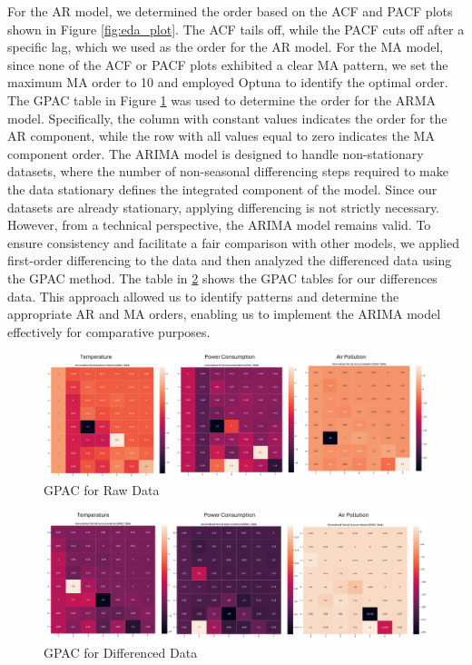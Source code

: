 \documentclass{scrartcl}
\begin{document}
For the AR model, we determined the order based on the ACF and PACF plots shown in Figure \ref{fig:eda_plot}. The ACF tails off, while the PACF cuts off after a specific lag, which we used as the order for the AR model. For the MA model, since none of the ACF or PACF plots exhibited a clear MA pattern, we set the maximum MA order to 10 and employed Optuna to identify the optimal order. The GPAC table in Figure \ref{fig:gpac1} was used to determine the order for the ARMA model. Specifically, the column with constant values indicates the order for the AR component, while the row with all values equal to zero indicates the MA component order. The ARIMA model is designed to handle non-stationary datasets, where the number of non-seasonal differencing steps required to make the data stationary defines the integrated component of the model. Since our datasets are already stationary, applying differencing is not strictly necessary. However, from a technical perspective, the ARIMA model remains valid. To ensure consistency and facilitate a fair comparison with other models, we applied first-order differencing to the data and then analyzed the differenced data using the GPAC method. The table in \ref{fig:gpac2} shows the GPAC tables for our differences data. This approach allowed us to identify patterns and determine the appropriate AR and MA orders, enabling us to implement the ARIMA model effectively for comparative purposes.

\begin{figure}[H]
	\begin{center}
		\includegraphics[scale=0.7]{Latex_report/fig/gpac1.pdf}
	\end{center}
	\caption{GPAC for Raw Data}
	\label{fig:gpac1}
\end{figure}

\begin{figure}[H]
	\begin{center}
		\includegraphics[scale=0.7]{Latex_report/fig/gpac2.pdf}
	\end{center}
	\caption{GPAC for Differenced  Data}
	\label{fig:gpac2}
\end{figure}
\end{document}
